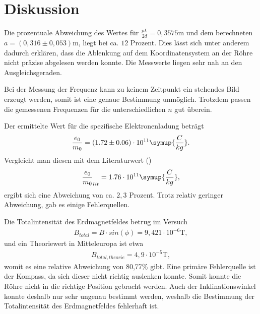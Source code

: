 \section{Diskussion}
\label{sec:Diskussion}

Die prozentuale Abweichung des Wertes für $\frac{pL}{2d} = 0,3575 \si{\meter} $ und dem berechneten $a = (0,316 \pm 0,053)  \si{\meter}$, liegt bei ca. $12$ Prozent.
Dies lässt sich unter anderem dadurch erklären, dass die Ablenkung auf dem Koordinatensystem an der Röhre nicht präzise abgelesen werden konnte.
Die Messwerte liegen sehr nah an den Ausgleichsgeraden.

\noindent Bei der Messung der Frequenz kann zu keinem Zeitpunkt ein stehendes Bild erzeugt werden, somit ist eine genaue Bestimmung unmöglich. 
Trotzdem passen die gemessenen Frequenzen für die unterschiedlichen $n$ gut überein.

\noindent 
Der ermittelte Wert für die spezifische Elektronenladung beträgt 
\begin{align*}
\frac{e_0}{m_0} = (1.72 \pm 0.06) \cdot 10^{11} \symup{\frac{C}{kg}} .
\end{align*}
Vergleicht man diesen mit dem Literaturwert (\cite{kent3})
\begin{align*}
\frac{e_0}{m_0}_{lit} = 1.76 \cdot 10^{11} \symup{\frac{C}{kg}},
\end{align*}
ergibt sich eine Abweichung von ca. $2,3$ Prozent. Trotz relativ geringer Abweichung, gab es einige Fehlerquellen.

Die Totalintensität des Erdmagnetfeldes betrug im Versuch 
\begin{align*}
B_{total} = B \cdot sin(\phi) = 9,421 \cdot 10^{-6} \si{\tesla},
\end{align*}
und ein Theoriewert in Mitteleuropa\cite{kent4} ist etwa
\begin{align*}
B_{total,theorie} =  4,9 \cdot 10^{-5} \si{\tesla},
\end{align*}
womit es eine relative Abweichung von 80,77\% gibt.
Eine primäre Fehlerquelle ist der Kompass, da sich dieser nicht richtig auslenken konnte.
Somit konnte die Röhre nicht in die richtige Position gebracht werden. 
Auch der Inklinationswinkel konnte deshalb nur sehr ungenau bestimmt werden, 
weshalb die Bestimmung der Totalintensität des Erdmagnetfeldes fehlerhaft ist.